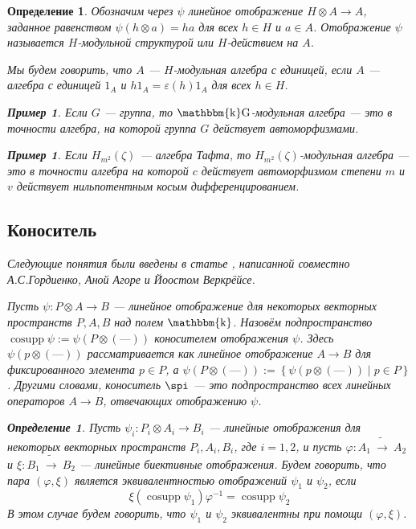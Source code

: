 \documentclass[12pt, reqno, a4paper, oneside, notitlepage]{amsart}
\theoremstyle{mytheoremstyle}
\theoremstyle{myremarkstyle}
\newtheorem{example}[theorem]{Пример}
\newtheorem{definition}[theorem]{Определение}
\numberwithin{equation}{section}
\DeclareMathOperator{\cosupp}{cosupp}
\DeclareMathOperator{\fld}{\mathbbm{k}}
\DeclareMathOperator{\kG}{\mathbbm{k}G}
\begin{document}
\begin{definition}
Обозначим через $\psi$ линейное отображение $H \otimes A \to A$, заданное равенством $\psi(h \otimes a) = ha$ для всех $h \in H$ и $a \in A$. 
Отображение $\psi$ называется \textit{$H$-модульной структурой} или \textit{$H$-действием} на $A$.

Мы будем говорить, что $A$ --- \textit{$H$-модульная алгебра с единицей}, если $A$ --- алгебра с единицей $1_A$ и $h1_A = \varepsilon(h)1_A$ для всех $h \in H$.

\begin{example}
  Если $G$ --- группа, то $\kG$-модульная алгебра --- это в точности алгебра, на которой группа $G$ действует автоморфизмами.
\end{example}

\begin{example}
  Если $H_{m^2}(\zeta)$ --- алгебра Тафта, то $H_{m^2}(\zeta)$-модульная алгебра --- это в точности алгебра на которой $c$ действует автоморфизмом степени $m$ и 
  $v$ действует нильпотентным косым дифференцированием.
\end{example}

\subsection{Коноситель}
Следующие понятия были введены в статье \cite{ASGordienko21ALAgoreJVercruysse}, написанной совместно А.С.Гордиенко, Аной Агоре и Йоостом Веркрёйсе.

Пусть $\psi: P \otimes A \to B$ --- линейное отображение для некоторых векторных пространств $P, A, B$ над полем $\fld$.
Назовём подпространство $\cosupp \psi := \psi\left(P \otimes (\text{---})\right)$ \textit{коносителем} отображения $\psi$.
Здесь $\psi(p \otimes (\text{---}))$ рассматривается как линейное отображение $A \to B$ для фиксированного элемента $p \in P$, 
а $\psi\left(P \otimes (\text{---})\right):= \left\{\psi(p \otimes(\text{---})) \mid p \in P\right\}$.
Другими словами, коноситель $\spi$ --- это подпространство всех линейных операторов $A \to B$, отвечающих отображению $\psi$.

\begin{definition} \label{equal module}
  Пусть $\psi_i:P_i \otimes A_i \to B_i$ --- линейные отображения для некоторых векторных пространств $P_i, A_i, B_i$, где $i =1,2$, и пусть
  $\varphi: A_1\  \widetilde{\to}\ A_2$ и $\xi: B_1\  \widetilde{\to}\ B_2$ --- линейные биективные отображения. Будем говорить, что пара $(\varphi, \xi)$
  является \textit{эквивалентностью} отображений $\psi_1$ и $\psi_2$, если
  \[
	\xi(\cosupp \psi_1)\varphi^{-1} = \cosupp \psi_2
  \]
  В этом случае будем говорить, что $\psi_1$ и $\psi_2$ \textit{эквивалентны} при помощи $(\varphi, \xi)$.
\end{definition}


\end{definition}
\end{document}

